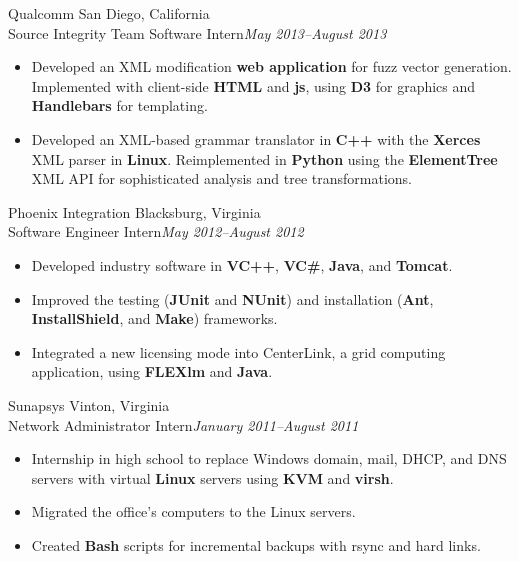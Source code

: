 \documentclass[letter]{article}
\begin{document}
    \begin{minipage}{\textwidth}
    \bigskip
  
    {\large Qualcomm } \hfill San Diego, California \\
    Source Integrity Team Software Intern\hfill {\it May 2013--August 2013}\begin{itemize}
      
        \item Developed an XML modification {\bf web application} for fuzz vector generation. Implemented with client-side {\bf HTML} and {\bf js}, using {\bf D3} for graphics and {\bf Handlebars} for templating.
      
        \item Developed an XML-based grammar translator in {\bf C++} with the {\bf Xerces} XML parser in {\bf Linux}. Reimplemented in {\bf Python} using the {\bf ElementTree} XML API for sophisticated analysis and tree transformations.
      
      \end{itemize}\end{minipage}
    \begin{minipage}{\textwidth}
    \bigskip
  
    {\large Phoenix Integration } \hfill Blacksburg, Virginia \\
    Software Engineer Intern\hfill {\it May 2012--August 2012}\begin{itemize}
      
        \item Developed industry software in {\bf VC++}, {\bf VC\#}, {\bf Java}, and {\bf Tomcat}.
      
        \item Improved the testing ({\bf JUnit} and {\bf NUnit}) and installation ({\bf Ant}, {\bf InstallShield}, and {\bf Make}) frameworks.
      
        \item Integrated a new licensing mode into CenterLink, a grid computing application, using {\bf FLEXlm} and {\bf Java}.
      
      \end{itemize}\end{minipage}
    \begin{minipage}{\textwidth}
    \bigskip
  
    {\large Sunapsys } \hfill Vinton, Virginia \\
    Network Administrator Intern\hfill {\it January 2011--August 2011}\begin{itemize}
      
        \item Internship in high school to replace Windows domain, mail, DHCP, and DNS servers with virtual {\bf Linux} servers using {\bf KVM} and {\bf virsh}.
      
        \item Migrated the office's computers to the Linux servers.
      
        \item Created {\bf Bash} scripts for incremental backups with rsync and hard links.
      
      \end{itemize}\end{minipage}
\end{document}
